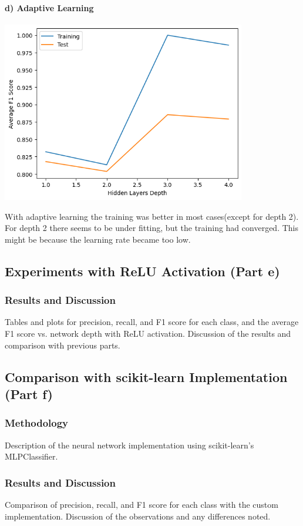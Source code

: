 \documentclass[12pt]{article}
\begin{document}
\paragraph{d) Adaptive Learning}
\begin{center}
    \includegraphics[width=0.8\textwidth]{Assignment 3/q2/(d).png}
\end{center}

With adaptive learning the training was better in most cases(except for depth 2). For depth 2 there seems to be under fitting, but the training had converged. This might be because the learning rate became too low.

\subsection{Experiments with ReLU Activation (Part e)}

\subsubsection{Results and Discussion}
Tables and plots for precision, recall, and F1 score for each class, and the average F1 score vs. network depth with ReLU activation. Discussion of the results and comparison with previous parts.

\subsection{Comparison with scikit-learn Implementation (Part f)}
\subsubsection{Methodology}
Description of the neural network implementation using scikit-learn's MLPClassifier.

\subsubsection{Results and Discussion}
Comparison of precision, recall, and F1 score for each class with the custom implementation. Discussion of the observations and any differences noted.
\end{document}
